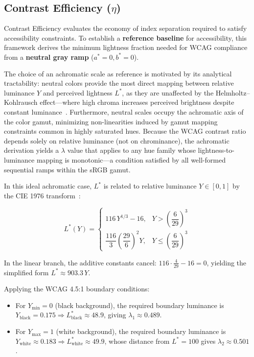 \subsection{Contrast Efficiency ($\eta$)}
\label{subsec:contrast-efficiency}

Contrast Efficiency evaluates the economy of index separation required to satisfy accessibility constraints. To establish a \textbf{reference baseline} for accessibility, this framework derives the minimum lightness fraction needed for WCAG compliance from a \textbf{neutral gray ramp} ($a^* = 0, b^* = 0$).

The choice of an achromatic scale as reference is motivated by its analytical tractability: neutral colors provide the most direct mapping between relative luminance $Y$ and perceived lightness $L^*$, as they are unaffected by the Helmholtz--Kohlrausch effect---where high chroma increases perceived brightness despite constant luminance~\cite{high2023}. Furthermore, neutral scales occupy the achromatic axis of the color gamut, minimizing non-linearities induced by gamut mapping constraints common in highly saturated hues. Because the WCAG contrast ratio depends solely on relative luminance (not on chrominance), the achromatic derivation yields a $\lambda$ value that applies to any hue family whose lightness-to-luminance mapping is monotonic---a condition satisfied by all well-formed sequential ramps within the sRGB gamut.

In this ideal achromatic case, $L^*$ is related to relative luminance $Y \in [0,1]$ by the CIE 1976 transform~\cite{iso11664}:

\[
L^*(Y) =
\begin{cases}
116\,Y^{1/3} - 16, & Y > \left(\dfrac{6}{29}\right)^3 \\[6pt]
\dfrac{116}{3}\left(\dfrac{29}{6}\right)^2 Y, & Y \le \left(\dfrac{6}{29}\right)^3
\end{cases}
\]

\noindent
In the linear branch, the additive constants cancel: $116 \cdot \frac{4}{29} - 16 = 0$, yielding the simplified form $L^* \approx 903.3\,Y$.

Applying the WCAG 4.5:1 boundary conditions:
\begin{itemize}
\item For $Y_{\min}=0$ (black background), the required boundary luminance is $Y_{\text{black}} = 0.175 \Rightarrow L^*_{\text{black}} \approx 48.9$, giving $\lambda_1 \approx 0.489$.
\item For $Y_{\max}=1$ (white background), the required boundary luminance is $Y_{\text{white}} \approx 0.183 \Rightarrow L^*_{\text{white}} \approx 49.9$, whose distance from $L^*=100$ gives $\lambda_2 \approx 0.501$.
\end{itemize}

